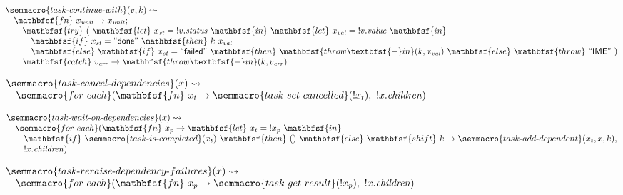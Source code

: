\vspace{0.75em}
\noindent
$\begin{array}{@{}l@{}}
\semmacro{task\text{-}continue\text{-}with}(v, k) \rightsquigarrow \\
\quad \mathbfsf{fn}\ x_{\mathit{unit}} \to x_{\mathit{unit}} \mathbin{;} \\
\quad\quad \mathbfsf{try}\ (\
  \mathbfsf{let}\ x_{\mathit{st}} = {!v.\mathit{status}}\ \mathbfsf{in}\
  \mathbfsf{let}\ x_{\mathit{val}} = {!v.\mathit{value}}\ \mathbfsf{in} \\
\quad\quad\quad \mathbfsf{if}\ x_{\mathit{st}} = \textsf{``done''}\
      \mathbfsf{then}\ k\ x_{\mathit{val}} \\
\quad\quad\quad \mathbfsf{else}\ \mathbfsf{if}\ x_{\mathit{st}} = \textsf{``failed''}\
      \mathbfsf{then}\ \mathbfsf{throw\textbfsf{-}in}(k, x_{\mathit{val}})\
      \mathbfsf{else}\ \mathbfsf{throw}\ \textsf{``IME''}\ ) \\
\quad\quad \mathbfsf{catch}\ v_{\mathit{err}} \to \mathbfsf{throw\textbfsf{-}in}(k, v_{\mathit{err}})
\end{array}$

\vspace{0.75em}
\noindent
$\begin{array}{@{}l@{}}
\semmacro{task\text{-}cancel\text{-}dependencies}(x) \rightsquigarrow \\
\quad \semmacro{for\text{-}each}(\mathbfsf{fn}\ x_t \to
  \semmacro{task\text{-}set\text{-}cancelled}({!x_t}),\ {!x.\mathit{children}})
\end{array}$

\vspace{0.75em}
\noindent
$\begin{array}{@{}l@{}}
\semmacro{task\text{-}wait\text{-}on\text{-}dependencies}(x) \rightsquigarrow \\
\quad \semmacro{for\text{-}each}(\mathbfsf{fn}\ x_p \to
  \mathbfsf{let}\ x_t = {!x_p}\ \mathbfsf{in} \\
\quad\quad \mathbfsf{if}\ \semmacro{task\text{-}is\text{-}completed}(x_t)\
      \mathbfsf{then}\ ()\
      \mathbfsf{else}\ \mathbfsf{shift}\ k \to
        \semmacro{task\text{-}add\text{-}dependent}(x_t, x, k), \\
\quad\quad {!x.\mathit{children}})
\end{array}$

\vspace{0.75em}
\noindent
$\begin{array}{@{}l@{}}
\semmacro{task\text{-}reraise\text{-}dependency\text{-}failures}(x) \rightsquigarrow \\
\quad \semmacro{for\text{-}each}(\mathbfsf{fn}\ x_p \to
  \semmacro{task\text{-}get\text{-}result}({!x_p}),\ {!x.\mathit{children}})
\end{array}$

